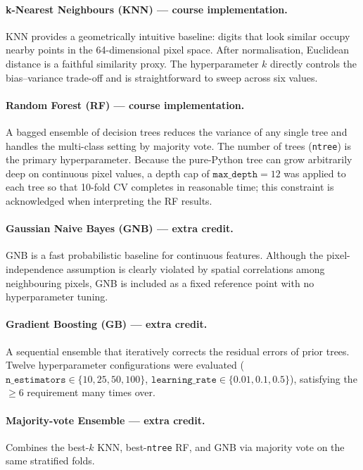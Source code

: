 \documentclass[11pt,letterpaper]{article}
\begin{document}
\paragraph{k-Nearest Neighbours (KNN) --- course implementation.}
KNN provides a geometrically intuitive baseline: digits that look similar
occupy nearby points in the 64-dimensional pixel space.  After normalisation,
Euclidean distance is a faithful similarity proxy.  The hyperparameter $k$
directly controls the bias--variance trade-off and is straightforward to
sweep across six values.

\paragraph{Random Forest (RF) --- course implementation.}
A bagged ensemble of decision trees reduces the variance of any single tree
and handles the multi-class setting by majority vote.  The number of trees
(\texttt{ntree}) is the primary hyperparameter.  Because the pure-Python tree
can grow arbitrarily deep on continuous pixel values, a depth cap of
$\texttt{max\_depth}=12$ was applied to each tree so that 10-fold CV
completes in reasonable time; this constraint is acknowledged when
interpreting the RF results.

\paragraph{Gaussian Naive Bayes (GNB) --- extra credit.}
GNB is a fast probabilistic baseline for continuous features.  Although the
pixel-independence assumption is clearly violated by spatial correlations
among neighbouring pixels, GNB is included as a fixed reference point with no
hyperparameter tuning.

\paragraph{Gradient Boosting (GB) --- extra credit.}
A sequential ensemble that iteratively corrects the residual errors of prior
trees.  Twelve hyperparameter configurations were evaluated
($\texttt{n\_estimators} \in \{10,25,50,100\}$,
$\texttt{learning\_rate} \in \{0.01,0.1,0.5\}$), satisfying the $\geq 6$
requirement many times over.

\paragraph{Majority-vote Ensemble --- extra credit.}
Combines the best-$k$ KNN, best-\texttt{ntree} RF, and GNB via majority vote
on the same stratified folds.
\end{document}
